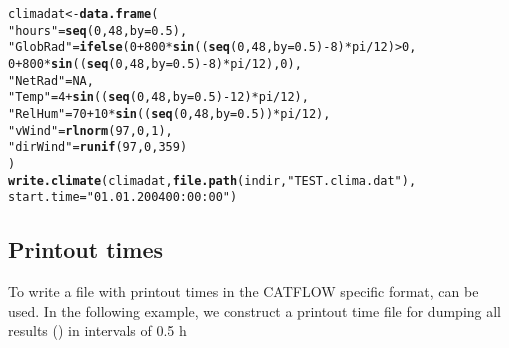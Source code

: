 \documentclass[article,nojss]{jss}\usepackage[]{graphicx}\usepackage[]{xcolor}
\makeatletter
\newcommand{\hlnum}[1]{\textcolor[rgb]{0.686,0.059,0.569}{#1}}%
\newcommand{\hlsng}[1]{\textcolor[rgb]{0.192,0.494,0.8}{#1}}%
\newcommand{\hlopt}[1]{\textcolor[rgb]{0,0,0}{#1}}%
\newcommand{\hldef}[1]{\textcolor[rgb]{0.345,0.345,0.345}{#1}}%
\newcommand{\hlkwb}[1]{\textcolor[rgb]{0.69,0.353,0.396}{#1}}%
\newcommand{\hlkwc}[1]{\textcolor[rgb]{0.333,0.667,0.333}{#1}}%
\newcommand{\hlkwd}[1]{\textcolor[rgb]{0.737,0.353,0.396}{\textbf{#1}}}%
\newenvironment{kframe}{%
 \def\at@end@of@kframe{}%
 \ifinner\ifhmode%
  \def\at@end@of@kframe{\end{minipage}}%
  \begin{minipage}{\columnwidth}%
 \fi\fi%
 \def\FrameCommand##1{\hskip\@totalleftmargin \hskip-\fboxsep
 \colorbox{shadecolor}{##1}\hskip-\fboxsep
     \hskip-\linewidth \hskip-\@totalleftmargin \hskip\columnwidth}%
 \MakeFramed {\advance\hsize-\width
   \@totalleftmargin\z@ \linewidth\hsize
   \@setminipage}}%
 {\par\unskip\endMakeFramed%
 \at@end@of@kframe}
\newenvironment{knitrout}{}{} %
\makeatother
\begin{document}
\begin{knitrout}
\color{fgcolor}\begin{kframe}
\begin{alltt}
 \hldef{climadat} \hlkwb{<-} \hlkwd{data.frame}\hldef{(}
      \hlsng{"hours"} \hldef{=} \hlkwd{seq}\hldef{(}\hlnum{0}\hldef{,}\hlnum{48}\hldef{,} \hlkwc{by}\hldef{=}\hlnum{0.5}\hldef{),}
      \hlsng{"GlobRad"} \hldef{=}  \hlkwd{ifelse}\hldef{(}\hlnum{0} \hlopt{+} \hlnum{800} \hlopt{*} \hlkwd{sin}\hldef{((}\hlkwd{seq}\hldef{(}\hlnum{0}\hldef{,}\hlnum{48}\hldef{,} \hlkwc{by}\hldef{=}\hlnum{0.5}\hldef{)} \hlopt{-} \hlnum{8}\hldef{)}\hlopt{*}\hldef{pi}\hlopt{/}\hlnum{12}\hldef{)} \hlopt{>} \hlnum{0}\hldef{,}
                          \hlnum{0} \hlopt{+} \hlnum{800} \hlopt{*} \hlkwd{sin}\hldef{((}\hlkwd{seq}\hldef{(}\hlnum{0}\hldef{,}\hlnum{48}\hldef{,} \hlkwc{by}\hldef{=}\hlnum{0.5}\hldef{)} \hlopt{-} \hlnum{8}\hldef{)}\hlopt{*}\hldef{pi}\hlopt{/}\hlnum{12}\hldef{),}  \hlnum{0}\hldef{),}
      \hlsng{"NetRad"} \hldef{=} \hlnum{NA} \hldef{,}
      \hlsng{"Temp"} \hldef{=} \hlnum{4} \hlopt{+}  \hlkwd{sin}\hldef{((}\hlkwd{seq}\hldef{(}\hlnum{0}\hldef{,}\hlnum{48}\hldef{,} \hlkwc{by}\hldef{=}\hlnum{0.5}\hldef{)} \hlopt{-} \hlnum{12}\hldef{)}\hlopt{*}\hldef{pi}\hlopt{/}\hlnum{12}\hldef{)  ,}
      \hlsng{"RelHum"} \hldef{=} \hlnum{70} \hlopt{+} \hlnum{10}\hlopt{*} \hlkwd{sin}\hldef{((}\hlkwd{seq}\hldef{(}\hlnum{0}\hldef{,}\hlnum{48}\hldef{,} \hlkwc{by}\hldef{=}\hlnum{0.5}\hldef{))}\hlopt{*}\hldef{pi}\hlopt{/}\hlnum{12}\hldef{) ,}
      \hlsng{"vWind"}  \hldef{=}  \hlkwd{rlnorm}\hldef{(}\hlnum{97}\hldef{,} \hlnum{0}\hldef{,}\hlnum{1}\hldef{) ,}
      \hlsng{"dirWind"} \hldef{=} \hlkwd{runif}\hldef{(}\hlnum{97}\hldef{,} \hlnum{0}\hldef{,} \hlnum{359}\hldef{)}
      \hldef{)}
 \hlkwd{write.climate}\hldef{(climadat,} \hlkwd{file.path}\hldef{(indir,} \hlsng{"TEST.clima.dat"}\hldef{),}
                  \hlkwc{start.time}\hldef{=} \hlsng{"01.01.2004 00:00:00"} \hldef{)}
\end{alltt}
\end{kframe}
\end{knitrout}



\subsection{Printout times} 
           
To write a file with printout times in the CATFLOW specific
format,  can be used. 
In the following example, we construct a printout time file for dumping all results () in intervals of 0.5 h
 
\end{document}
